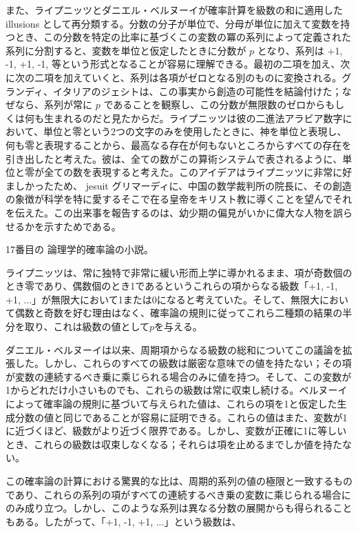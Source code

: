 \documentclass[a4paper,11pt,openany]{ltjsbook}
\begin{document}
また、ライプニッツとダニエル・ベルヌーイが確率計算を級数の和に適用した illusions として再分類する。分数の分子が単位で、分母が単位に加えて変数を持つとき、この分数を特定の比率に基づくこの変数の冪の系列によって定義された系列に分割すると、変数を単位と仮定したときに分数が $p$ となり、系列は +1, -1, +1, -1, 等という形式となることが容易に理解できる。最初の二項を加え、次に次の二項を加えていくと、系列は各項がゼロとなる別のものに変換される。グランディ、イタリアのジェシトは、この事実から創造の可能性を結論付けた；なぜなら、系列が常に $p$ であることを観察し、この分数が無限数のゼロからもしくは何も生まれるのだと見たからだ。ライプニッツは彼の二進法アラビア数字において、単位と零という2つの文字のみを使用したときに、神を単位と表現し、何も零と表現することから、最高なる存在が何もないところからすべての存在を引き出したと考えた。彼は、全ての数がこの算術システムで表されるように、単位と零が全ての数を表現すると考えた。このアイデアはライプニッツに非常に好ましかったため、 jesuit グリマーディに、中国の数学裁判所の院長に、その創造の象徴が科学を特に愛するそこで在る皇帝をキリスト教に導くことを望んでそれを伝えた。この出来事を報告するのは、幼少期の偏見がいかに偉大な人物を誤らせるかを示すためである。

17番目の 論理学的確率論の小説。

ライプニッツは、常に独特で非常に緩い形而上学に導かれるまま、項が奇数個のとき零であり、偶数個のとき1であるというこれらの項からなる級数「+1, -1, +1, ...」が無限大において1または0になると考えていた。そして、無限大において偶数と奇数を好む理由はなく、確率論の規則に従ってこれら二種類の結果の半分を取り、これは級数の値として$p$を与える。

ダニエル・ベルヌーイは以来、周期項からなる級数の総和についてこの議論を拡張した。しかし、これらのすべての級数は厳密な意味での値を持たない；その項が変数の連続するべき乗に乘じられる場合のみに値を持つ。そして、この変数が1からどれだけ小さいものでも、これらの級数は常に収束し続ける。ベルヌーイによって確率論の規則に基づいて与えられた値は、これらの項を1と仮定した生成分数の値と同じであることが容易に証明できる。これらの値はまた、変数が1に近づくほど、級数がより近づく限界である。しかし、変数が正確に1に等しいとき、これらの級数は収束しなくなる；それらは項を止めるまでしか値を持たない。

この確率論の計算における驚異的な比は、周期的系列の値の極限と一致するものであり、これらの系列の項がすべての連続するべき乗の変数に乘じられる場合にのみ成り立つ。しかし、このような系列は異なる分数の展開からも得られることもある。したがって、「+1, -1, +1, ...」という級数は、
\end{document}
